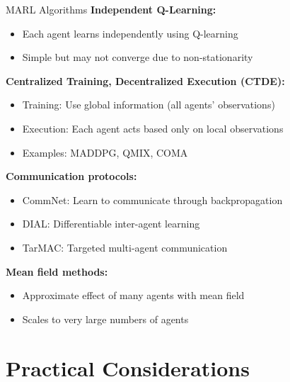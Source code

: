 \documentclass[aspectratio=169]{beamer}
\begin{document}
\begin{frame}{MARL Algorithms}
  \textbf{Independent Q-Learning:}
  \begin{itemize}
    \item Each agent learns independently using Q-learning
    \item Simple but may not converge due to non-stationarity
  \end{itemize}

  \vspace{0.5em}

  \textbf{Centralized Training, Decentralized Execution (CTDE):}
  \begin{itemize}
    \item Training: Use global information (all agents' observations)
    \item Execution: Each agent acts based only on local observations
    \item Examples: MADDPG, QMIX, COMA
  \end{itemize}

  \vspace{0.5em}

  \textbf{Communication protocols:}
  \begin{itemize}
    \item CommNet: Learn to communicate through backpropagation
    \item DIAL: Differentiable inter-agent learning
    \item TarMAC: Targeted multi-agent communication
  \end{itemize}

  \vspace{0.5em}

  \textbf{Mean field methods:}
  \begin{itemize}
    \item Approximate effect of many agents with mean field
    \item Scales to very large numbers of agents
  \end{itemize}
\end{frame}

\section{Practical Considerations}
\end{document}
